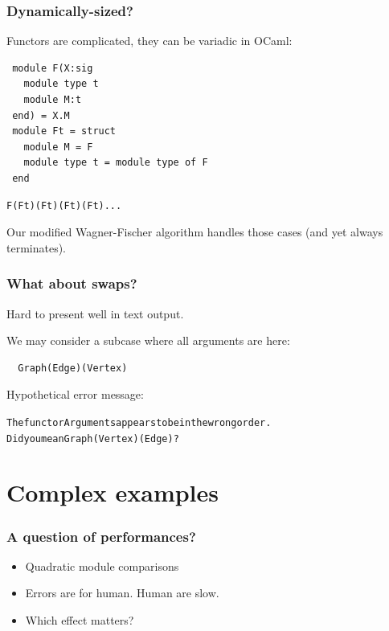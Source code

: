 \documentclass[11pt,aspectratio=169]{beamer}
\begin{document}
\begin{frame}[fragile]\frametitle{Dynamically-sized?}
  Functors are complicated, they can be variadic in OCaml:
   \begin{verbatim}
 module F(X:sig
   module type t
   module M:t
 end) = X.M
 module Ft = struct
   module M = F
   module type t = module type of F
 end
\end{verbatim}

\begin{verbatim}
F(Ft)(Ft)(Ft)(Ft)...
\end{verbatim}

  Our modified Wagner-Fischer algorithm handles those cases (and yet always terminates).
\end{frame}

\begin{frame}[fragile]\frametitle{What about swaps?}
  Hard to present well in text output.

  We may consider a subcase where all arguments are here:
\begin{verbatim}
  Graph(Edge)(Vertex)
\end{verbatim}

Hypothetical error message:
\begin{alltt}
The functor Arguments appears to be in the wrong order.
Did you mean Graph(Vertex)(Edge)?
\end{alltt}


\end{frame}



\section{Complex examples}

\begin{frame}[fragile] \frametitle{A question of performances?}
  \begin{itemize}
    \item{Quadratic module comparisons}
    \item{Errors are for human. Human are slow.}
    \item{Which effect matters?}
  \end{itemize}
\end{frame}
\end{document}
